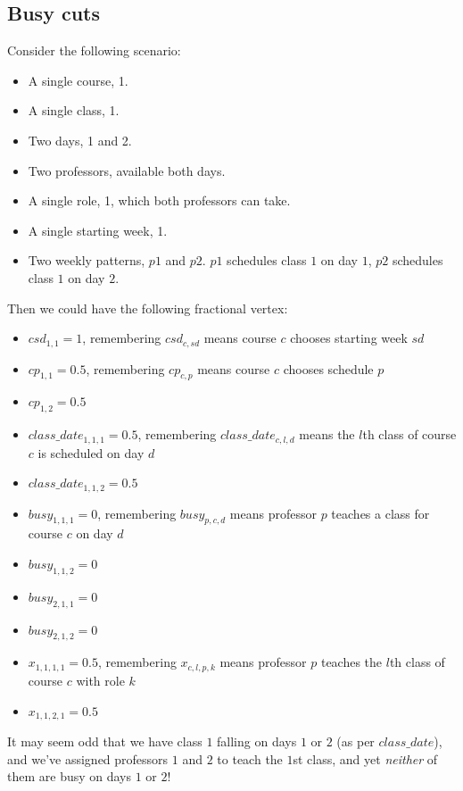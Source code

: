 \subsection{Busy cuts}

Consider the following scenario:
\begin{itemize}
\item A single course, 1.
\item A single class, 1.
\item Two days, 1 and 2.
\item Two professors, available both days.
\item A single role, 1, which both professors can take.
\item A single starting week, 1.
\item Two weekly patterns, $p1$ and $p2$. $p1$ schedules class $1$ on day $1$, $p2$ schedules class $1$ on day $2$.
\end{itemize}

Then we could have the following fractional vertex:

\begin{itemize}
\item $csd_{1, 1} = 1$, remembering $csd_{c, sd}$ means course $c$ chooses starting week $sd$
\item $cp_{1, 1} = 0.5$, remembering $cp_{c, p}$ means course $c$ chooses schedule $p$
\item $cp_{1, 2} = 0.5$
\item $class\_date_{1, 1, 1} = 0.5$, remembering $class\_date_{c, l, d}$ means the $l$th class of course $c$ is scheduled on day $d$
\item $class\_date_{1, 1, 2} = 0.5$
\item $busy_{1, 1, 1} = 0$, remembering $busy_{p, c, d}$ means professor $p$ teaches a class for course $c$ on day $d$
\item $busy_{1, 1, 2} = 0$
\item $busy_{2, 1, 1} = 0$
\item $busy_{2, 1, 2} = 0$
\item $x_{1, 1, 1, 1} = 0.5$, remembering $x_{c, l, p, k}$ means professor $p$ teaches the $l$th class of course $c$ with role $k$
\item $x_{1, 1, 2, 1} = 0.5$
\end{itemize}

It may seem odd that we have class $1$ falling on days $1$ or $2$ (as per $class\_date$), and we've assigned professors $1$ and $2$ to teach the $1$st class, and yet \emph{neither} of them are busy on days $1$ or $2$!

